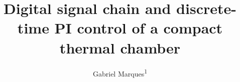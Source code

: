\documentclass[10pt,a4paper,twocolumn,english]{article}
\title{Digital signal chain and discrete-time PI control of a compact thermal chamber}
\author{Gabriel Marques\textsuperscript{1}}
\begin{document}
\twocolumn[
  \maketitle   %
]










\end{document}
